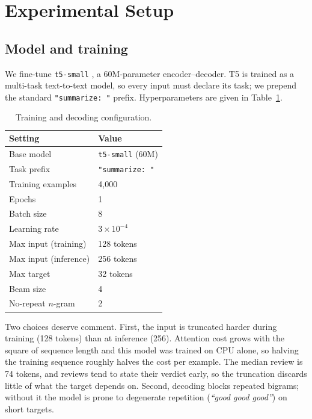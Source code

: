 \section{Experimental Setup}
\label{sec:setup}

\subsection{Model and training}

We fine-tune \texttt{t5-small} \cite{raffel2020t5}, a 60M-parameter
encoder--decoder. T5 is trained as a multi-task text-to-text model, so every
input must declare its task; we prepend the standard \texttt{"summarize: "}
prefix. Hyperparameters are given in Table~\ref{tab:hyper}.

\begin{table}[t]
\caption{Training and decoding configuration.}
\label{tab:hyper}
\centering
\begin{tabular}{ll}
\toprule
\textbf{Setting} & \textbf{Value} \\
\midrule
Base model              & \texttt{t5-small} (60M) \\
Task prefix             & \texttt{"summarize: "} \\
Training examples       & 4{,}000 \\
Epochs                  & 1 \\
Batch size              & 8 \\
Learning rate           & $3\times10^{-4}$ \\
Max input (training)    & 128 tokens \\
Max input (inference)   & 256 tokens \\
Max target              & 32 tokens \\
Beam size               & 4 \\
No-repeat $n$-gram      & 2 \\
\bottomrule
\end{tabular}
\end{table}

Two choices deserve comment. First, the input is truncated harder during
training (128 tokens) than at inference (256). Attention cost grows with the
square of sequence length and this model was trained on CPU alone, so halving
the training sequence roughly halves the cost per example. The median review is
74 tokens, and reviews tend to state their verdict early, so the truncation
discards little of what the target depends on. Second, decoding blocks repeated
bigrams; without it the model is prone to degenerate repetition
(\emph{``good good good''}) on short targets.


